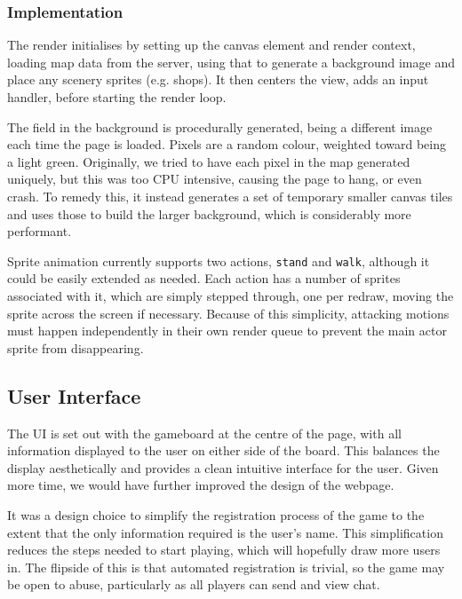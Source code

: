 \documentclass[12pt]{amsart}
\begin{document}
    \subsubsection{Implementation}
      \begin{flushleft}
        The render initialises by setting up the canvas element and render
        context, loading map data from the server, using that to generate a
        background image and place any scenery sprites (e.g. shops). It then
        centers the view, adds an input handler, before starting the render
        loop.

        The field in the background is procedurally generated, being a
        different image each time the page is loaded. Pixels are a random
        colour, weighted toward being a light green. Originally, we tried to have
        each pixel in the map generated uniquely, but this was too CPU
        intensive, causing the page to hang, or even crash. To remedy this,
        it instead generates a set of temporary smaller canvas tiles and uses
        those to build the larger background, which is considerably more
        performant.

        Sprite animation currently supports two actions, \verb/stand/ and
        \verb/walk/, although it could be easily extended as needed. Each
        action has a number of sprites associated with it, which are simply
        stepped through, one per redraw, moving the sprite across the screen if
        necessary. Because of this simplicity, attacking motions must
        happen independently in their own render queue to prevent the main
        actor sprite from disappearing.
      \end{flushleft}

  \subsection{User Interface}
    \begin{flushleft}
      The UI is set out with the gameboard at the centre of the page, with
      all information displayed to the user on either side
      of the board. This balances the display aesthetically and provides a clean intuitive
interface for the user. Given more time, we would have further improved the design of the
webpage.

It was a design choice to simplify the registration process of the game to the extent that the only
information required is the user's name. This simplification reduces the steps needed to start playing,
which will hopefully draw more users in. The flipside of this is that automated registration is trivial,
so the game may be open to abuse, particularly as all players can send and view chat.
\end{flushleft}
\end{document}
